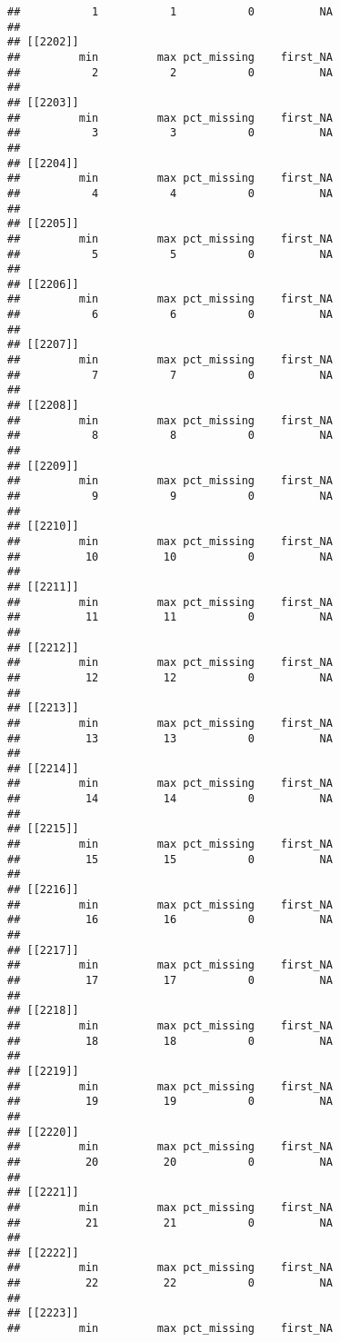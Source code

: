 \documentclass[
]{article}
\begin{document}
\begin{verbatim}
##           1           1           0          NA 
## 
## [[2202]]
##         min         max pct_missing    first_NA 
##           2           2           0          NA 
## 
## [[2203]]
##         min         max pct_missing    first_NA 
##           3           3           0          NA 
## 
## [[2204]]
##         min         max pct_missing    first_NA 
##           4           4           0          NA 
## 
## [[2205]]
##         min         max pct_missing    first_NA 
##           5           5           0          NA 
## 
## [[2206]]
##         min         max pct_missing    first_NA 
##           6           6           0          NA 
## 
## [[2207]]
##         min         max pct_missing    first_NA 
##           7           7           0          NA 
## 
## [[2208]]
##         min         max pct_missing    first_NA 
##           8           8           0          NA 
## 
## [[2209]]
##         min         max pct_missing    first_NA 
##           9           9           0          NA 
## 
## [[2210]]
##         min         max pct_missing    first_NA 
##          10          10           0          NA 
## 
## [[2211]]
##         min         max pct_missing    first_NA 
##          11          11           0          NA 
## 
## [[2212]]
##         min         max pct_missing    first_NA 
##          12          12           0          NA 
## 
## [[2213]]
##         min         max pct_missing    first_NA 
##          13          13           0          NA 
## 
## [[2214]]
##         min         max pct_missing    first_NA 
##          14          14           0          NA 
## 
## [[2215]]
##         min         max pct_missing    first_NA 
##          15          15           0          NA 
## 
## [[2216]]
##         min         max pct_missing    first_NA 
##          16          16           0          NA 
## 
## [[2217]]
##         min         max pct_missing    first_NA 
##          17          17           0          NA 
## 
## [[2218]]
##         min         max pct_missing    first_NA 
##          18          18           0          NA 
## 
## [[2219]]
##         min         max pct_missing    first_NA 
##          19          19           0          NA 
## 
## [[2220]]
##         min         max pct_missing    first_NA 
##          20          20           0          NA 
## 
## [[2221]]
##         min         max pct_missing    first_NA 
##          21          21           0          NA 
## 
## [[2222]]
##         min         max pct_missing    first_NA 
##          22          22           0          NA 
## 
## [[2223]]
##         min         max pct_missing    first_NA 

\end{verbatim}
\end{document}

